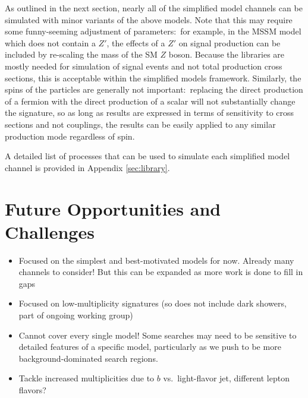 As outlined in the next section, nearly all of the simplified model channels can be simulated with minor variants of the above models. Note that this may require some funny-seeming adjustment of parameters:~for example, in the MSSM model which does not contain a $Z'$, the effects of a $Z'$ on signal production can be included by re-scaling the mass of the SM $Z$ boson. Because the libraries are mostly needed for simulation of signal events and not total production cross sections, this is acceptable within the simplified models framework. Similarly, the spins of the particles are generally not important:~replacing the direct production of a fermion with the direct production of a scalar will not substantially change the signature, so as long as results are expressed in terms of sensitivity to cross sections and not couplings, the results can be easily applied to any similar production mode regardless of spin.

A detailed list of processes that can be used to simulate each simplified model channel is provided in Appendix \ref{sec:library}.




\section{Future Opportunities and Challenges}\label{sec:simplified_future}
\begin{itemize}
\item Focused on the simplest and best-motivated models for now. Already many channels to consider! But this can be expanded as more work is done to fill in gaps
\item Focused on low-multiplicity signatures (so does not include dark showers, part of ongoing working group)
\item Cannot cover every single model! Some searches may need to be sensitive to detailed features of a specific model, particularly as we push to be more background-dominated search regions.
\item Tackle increased multiplicities due to $b$ vs.~light-flavor jet, different lepton flavors?
\end{itemize}
